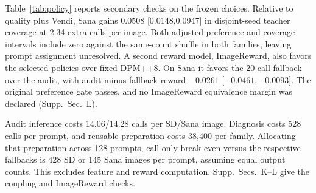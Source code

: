 Table~\ref{tab:policy} reports secondary checks on the frozen choices.
Relative to quality plus Vendi, Sana gains 0.0508 [0.0148,0.0947] in
disjoint-seed teacher coverage at 2.34 extra calls per image.
Both adjusted preference and coverage intervals include zero against the
same-count shuffle in both families, leaving prompt assignment unresolved.
A second reward model, ImageReward, also favors the selected policies
over fixed DPM++8. On Sana it favors the 20-call fallback over the audit,
with audit-minus-fallback reward $-0.0261$ [$-0.0461,-0.0093$].
The original preference gate passes, and no ImageReward equivalence margin
was declared (Supp.~Sec.~L).

Audit inference costs 14.06/14.28 calls per SD/Sana image. Diagnosis costs
528 calls per prompt, and reusable preparation costs 38,400 per family.
Allocating that preparation across 128 prompts, call-only break-even
versus the respective fallbacks is 428 SD or 145 Sana images per prompt,
assuming equal output counts. This excludes feature and reward computation.
Supp.~Secs.~K--L give the coupling and ImageReward checks.
